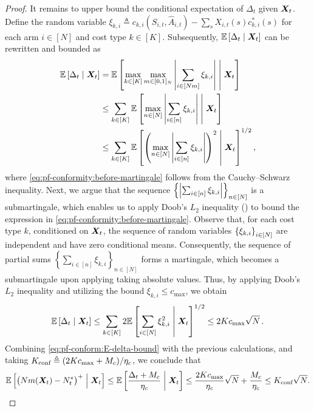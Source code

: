 \begin{proof}
It remains to upper bound the conditional expectation of $\Delta_t$ given ${\bm{X}}_t$. 
Define the random variable $\xi_{k,i} \triangleq c_{k,i}(S_{i,t},\widehat{A}_{i,t})- \sum_{s}X_{i,t}(s)c_{k,i}^*(s)$ for each arm $i\in[N]$ and cost type $k\in[K]$. 
Subsequently, $\mathbb{E}\left[\Delta_t\;\middle|\;{\bm{X}}_t\right]$ can be rewritten and bounded as 
\begin{align}
    \nonumber
     \mathbb{E}\left[\Delta_t\;\middle|\;{\bm{X}}_t\right] 
     &= \mathbb{E}\left[\max_{k\in[K]} \max_{m\in[0,1]_N} \left\lvert\sum_{i\in[Nm]}\xi_{k,i}\right\rvert \;\middle|\; {\bm{X}}_t\right] \\
     \nonumber
     &\leq  \sum_{k\in[K]} \mathbb{E}\left[\max_{n\in[N]}\left\lvert\sum_{i\in[n]}\xi_{k,i}\right\rvert \;\middle|\; {\bm{X}}_t\right] \\
    \label{eq:pf-conformity:before-martingale}
     &\leq  \sum_{k\in[K]} \mathbb{E}\left[\left(\max_{n\in[N]} \left\lvert\sum_{i\in[n]}\xi_{k,i}\right\rvert\right)^2 \;\middle|\; {\bm{X}}_t\right]^{1/2},
\end{align}
where \eqref{eq:pf-conformity:before-martingale} follows from the Cauchy–Schwarz inequality. 
Next, we argue that the sequence $\left\{ \left\lvert\sum_{i\in[n]}\xi_{k,i}\right\rvert \right\}_{n\in[N]}$ is a submartingale, which enables us to apply Doob's $L_2$ inequality (\citealp[Theorem 5.4.3]{Dur_19_prob_book}) to bound the expression in \eqref{eq:pf-conformity:before-martingale}. Observe that, for each cost type $k$, conditioned on ${\bm{X}}_t$, the sequence of random variables $\left\{ \xi_{k,i} \right\}_{i\in[N]}$ are independent and have zero conditional means. 
Consequently, the sequence of partial sums $\left\{\sum_{i\in[n]}\xi_{k,i}\right\}_{n\in[N]}$ forms a martingale, which becomes a submartingale upon applying taking absolute values. 
Thus, by applying Doob's $L_2$ inequality and utilizing the bound $\xi_{k,i}\leq c_{\max}$, we obtain 
\begin{equation}
    \label{eq:pf-conform:E-delta-bound}
    \mathbb{E}\left[\Delta_t\;\middle|\;{\bm{X}}_t\right] 
    \leq \sum_{k\in[K]} 2\mathbb{E}\left[ \sum_{i\in[N]}\xi_{k,i}^2 \;\middle|\; {\bm{X}}_t\right]^{1/2} 
    \leq 2Kc_{\max}\sqrt{N}\,.
\end{equation}
Combining \eqref{eq:pf-conform:E-delta-bound} with the previous calculations, and taking $K_{\text{conf}} \triangleq (2Kc_{\max} + M_c) / \eta_c$, we conclude that 
\begin{align*}
    \mathbb{E}\left[\big(Nm({\bm{X}}_t) - N_t^*\big)^+ \;\middle|\; {\bm{X}}_t\right] 
    \leq \mathbb{E}\left[\frac{\Delta_t+M_c}{\eta_c} \;\middle|\; {\bm{X}}_t\right] 
    \leq \frac{2Kc_{\max}}{\eta_c}\sqrt{N}+\frac{M_c}{\eta_c} \leq K_{\text{conf}}\sqrt{N}. 
\end{align*}

\end{proof}



